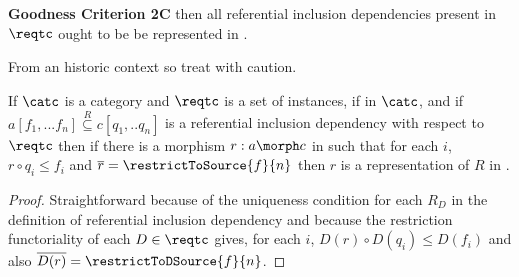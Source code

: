 \textbf {Goodness Criterion 2C} \IfSforCwithRCwords 
then all referential inclusion dependencies present in $\reqtc$
ought to be be represented in \catcp.
\begin{pathNotTaken}
From an historic context so treat with caution.
\begin{lemma}
\label{catRefIncSublemma}
If $\catc$ is a category and $\reqtc$ is a set of instances,
if \fnsourceqnsource in $\catc$, 
and if $a[f_1,...f_n] \overset{R}{\subseteq} c[q_1,..q_n]$ 
is a referential inclusion dependency with respect to $\reqtc$ 
then if there is a morphism $r: a \morph c$ in \catcw 
such that for each $i$, $r \circ q_i \leq f_i$
and $\overline{r} = \restrictToSource{f}{n}$ 
then $r$ is a representation of $R$  in  \catc. 
\end{lemma}
\begin{proof}
Straightforward because of the uniqueness condition for each $R_D$ in the definition of referential inclusion dependency and because the restriction functoriality of each $D \in \reqtc$ gives, 
for each $i$, $D(r) \circ D(q_i) \leq D(f_i)$
and also $\overline{D(r)}=\restrictToDSource{f}{n}$.
\end{proof}
\end{pathNotTaken}